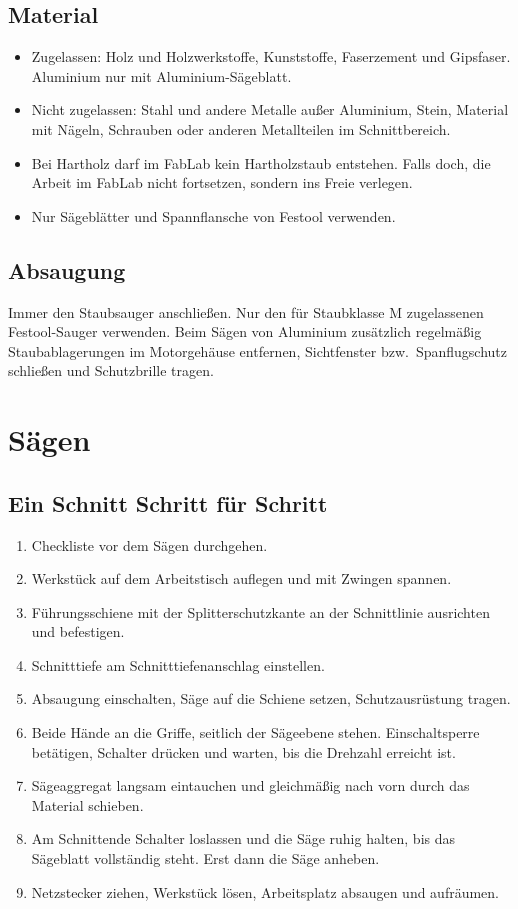 \documentclass{\basedir/fablab-document}
\begin{document}
	\subsection{Material}
	\begin{itemize}
		\item Zugelassen: Holz und Holzwerkstoffe, Kunststoffe, Faserzement und Gipsfaser. Aluminium nur mit Aluminium-Sägeblatt.
		\item Nicht zugelassen: Stahl und andere Metalle außer Aluminium, Stein, Material mit Nägeln, Schrauben oder anderen Metallteilen im Schnittbereich.
		\item Bei Hartholz darf im FabLab kein Hartholzstaub entstehen. Falls doch, die Arbeit im FabLab nicht fortsetzen, sondern ins Freie verlegen.
		\item Nur Sägeblätter und Spannflansche von Festool verwenden.
	\end{itemize}

	\subsection{Absaugung}
	Immer den Staubsauger anschließen. Nur den für Staubklasse M zugelassenen Festool-Sauger verwenden. Beim Sägen von Aluminium zusätzlich regelmäßig Staubablagerungen im Motorgehäuse entfernen, Sichtfenster bzw.\ Spanflugschutz schließen und Schutzbrille tragen.

	\section{Sägen}

	\subsection{Ein Schnitt Schritt für Schritt}
	\begin{enumerate}
		\item Checkliste vor dem Sägen durchgehen.
		\item Werkstück auf dem Arbeitstisch auflegen und mit Zwingen spannen.
		\item Führungsschiene mit der Splitterschutzkante an der Schnittlinie ausrichten und befestigen.
		\item Schnitttiefe am Schnitttiefenanschlag einstellen.
		\item Absaugung einschalten, Säge auf die Schiene setzen, Schutzausrüstung tragen.
		\item Beide Hände an die Griffe, seitlich der Sägeebene stehen. Einschaltsperre betätigen, Schalter drücken und warten, bis die Drehzahl erreicht ist.
		\item Sägeaggregat langsam eintauchen und gleichmäßig nach vorn durch das Material schieben.
		\item Am Schnittende Schalter loslassen und die Säge ruhig halten, bis das Sägeblatt vollständig steht. Erst dann die Säge anheben.
		\item Netzstecker ziehen, Werkstück lösen, Arbeitsplatz absaugen und aufräumen.
	\end{enumerate}
\end{document}

